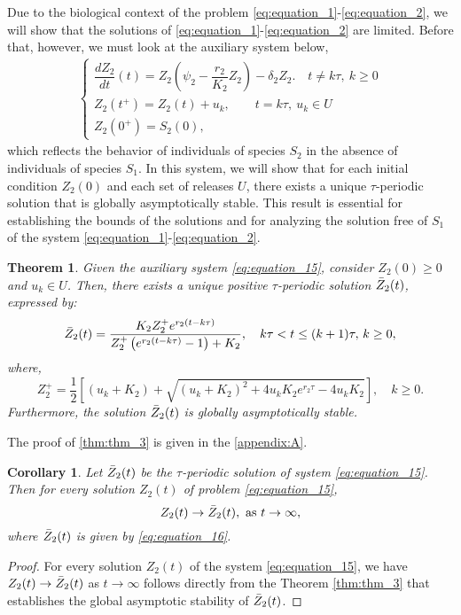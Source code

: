 \documentclass[10pt,letterpaper]{article}
\newtheorem{theorem}{Theorem}
\newtheorem{corollary}{Corollary}
\begin{document}
Due to the biological context of the problem \eqref{eq:equation_1}-\eqref{eq:equation_2}, we will show that the solutions of \eqref{eq:equation_1}-\eqref{eq:equation_2} are limited. Before that, however, we must look at the auxiliary system below, 
\begin{align}
\begin{cases}\label{eq:equation_15}
\dfrac{dZ_2}{dt}(t) = Z_2\left(\psi_2 - \dfrac{r_2}{K_2} Z_2\right) - \delta_2 Z_2.
\quad t \neq k\tau, \ k \geq 0  \\    
Z_2(t^+)=Z_2(t) + u_k,  \qquad t = k\tau, \ u_k \in U\\
Z_2(0^+)=S_2(0),
\end{cases}
\end{align} which reflects the behavior of individuals of species $S_2$ in the absence of individuals of species $S_1$. In this system, we will show that for each initial condition  $Z_2(0)$  and each set of releases  $U$, there exists a unique $\tau$-periodic solution that is globally asymptotically stable. This result is essential for establishing the bounds of the solutions and for analyzing the solution free of $S_1$ of the system \eqref{eq:equation_1}-\eqref{eq:equation_2}.
\begin{theorem}\label{thm:thm_3}
    Given the auxiliary system \eqref{eq:equation_15}, consider $Z_2(0) \geq 0$ and $u_k \in U$. Then, there exists a unique positive $\tau$-periodic solution $\Bar{Z}_2(t)$, expressed by:
\begin{equation}\label{eq:equation_16}
    \Bar{Z}_2(t) = \dfrac{K_2 Z_2^{+} e^{r_2 (t-k\tau)}}{Z_2^{+}\left(e^{r_2 (t-k\tau)} -1\right) + K_2}, \quad k\tau < t \leq (k+1)\tau, \, k \geq 0,
\end{equation}
where,
\begin{equation}\label{eq:equation_17}
   Z_2^+ = \frac{1}{2}\left[ (u_k + K_2) + \sqrt{(u_k + K_2)^2 + 4 u_k K_2 e^{r_2 \tau} - 4 u_k K_2} \right], \quad k \geq 0. 
\end{equation}
Furthermore, the solution $\Bar{Z}_2(t)$ is globally asymptotically stable.
\end{theorem}
The proof of \eqref{thm:thm_3} is given in the \eqref{appendix:A}.

\begin{corollary}\label{cor:cor_1}
    Let $\Bar{Z}_2(t)$ be the $\tau$-periodic solution of system \eqref{eq:equation_15}. Then for every solution $Z_2(t)$ of problem \eqref{eq:equation_15}, 
    \begin{equation}\label{eq:equation_18}
        Z_2(t) \to \Bar{Z}_2(t), \mbox{ as } t \to \infty,
    \end{equation}where $\Bar{Z}_2(t)$ is given by \eqref{eq:equation_16}.
\end{corollary}
\begin{proof}
    For every solution $Z_2(t)$ of the system \eqref{eq:equation_15}, we have $Z_2(t) \to \Bar{Z}_2(t)$ as  $t \to \infty$  follows directly from the Theorem \eqref{thm:thm_3} that establishes the global asymptotic stability of  $\Bar{Z}_2(t)$.
\end{proof}
\end{document}
